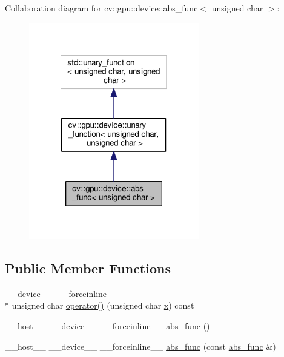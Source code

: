Collaboration diagram for cv\-:\-:gpu\-:\-:device\-:\-:abs\-\_\-func$<$ unsigned char $>$\-:\nopagebreak
\begin{figure}[H]
\begin{center}
\leavevmode
\includegraphics[width=210pt]{structcv_1_1gpu_1_1device_1_1abs__func_3_01unsigned_01char_01_4__coll__graph}
\end{center}
\end{figure}
\subsection*{Public Member Functions}
\begin{DoxyCompactItemize}
\item 
\-\_\-\-\_\-device\-\_\-\-\_\- \-\_\-\-\_\-forceinline\-\_\-\-\_\- \\*
unsigned char \hyperlink{structcv_1_1gpu_1_1device_1_1abs__func_3_01unsigned_01char_01_4_a54d755f2da06705b52f9f054bc8a5761}{operator()} (unsigned char \hyperlink{highgui__c_8h_a6150e0515f7202e2fb518f7206ed97dc}{x}) const 
\item 
\-\_\-\-\_\-host\-\_\-\-\_\- \-\_\-\-\_\-device\-\_\-\-\_\- \-\_\-\-\_\-forceinline\-\_\-\-\_\- \hyperlink{structcv_1_1gpu_1_1device_1_1abs__func_3_01unsigned_01char_01_4_a9b983c1925591f5b334db7f86bf6dfde}{abs\-\_\-func} ()
\item 
\-\_\-\-\_\-host\-\_\-\-\_\- \-\_\-\-\_\-device\-\_\-\-\_\- \-\_\-\-\_\-forceinline\-\_\-\-\_\- \hyperlink{structcv_1_1gpu_1_1device_1_1abs__func_3_01unsigned_01char_01_4_a15bab965e7b8abba1b7b0037905cfa67}{abs\-\_\-func} (const \hyperlink{structcv_1_1gpu_1_1device_1_1abs__func}{abs\-\_\-func} \&)
\end{DoxyCompactItemize}


